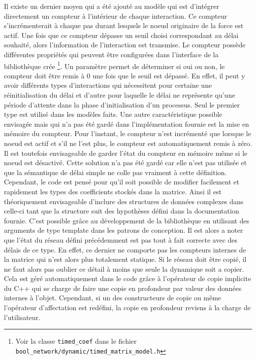 \documentclass[11pt, a4paper]{article}
\begin{document}
Il existe un dernier moyen qui a été ajouté au modèle qui est d'intégrer
directement un compteur à l'intérieur de chaque interaction. Ce compteur
s'incrémenterait à chaque pas durant lesquels le noeud originaire de la force
est actif. Une fois que ce compteur dépasse un seuil choisi correspondant au
délai souhaité, alors l'information de l'interaction est transmise. Le compteur
possède différentes propriétés qui peuvent être configurées dans l'interface de
la bibliothèque crée \footnote{Voir la classe \texttt{timed\_coef} dans le
fichier \texttt{bool\_network/dynamic/timed\_matrix\_model.h}}.  Un paramètre
permet de déterminer si oui ou non, le compteur doit être remis à $0$ une fois
que le seuil est dépassé. En effet, il peut y avoir différents types
d'interactions qui nécessitent pour certaine une réinitialisation du délai et
d'autre pour laquelle le délai ne représente qu'une période d'attente dans la
phase d'initialisation d'un processus. Seul le premier type est utilisé dans
les modèles faits. Une autre caractéristique possible envisagée mais qui n'a
pas été gardé dans l'implémentation fournie est la mise en mémoire du compteur.
Pour l'instant, le compteur n'est incrémenté que lorsque le noeud est actif et
s'il ne l'est plus, le compteur est automatiquement remis à zéro. Il est
toutefois envisageable de garder l'état du compteur en mémoire même si le noeud
est désactivé. Cette solution n'a pas été gardé car elle n'est pas utilisée et
que la sémantique de délai simple ne colle pas vraiment à cette définition.
Cependant, le code est pensé pour qu'il soit possible de modifier facilement et
rapidement les types des coefficients stockés dans la matrice. Ainsi il est
théoriquement envisageable d'inclure des structures de données complexes dans
celle-ci tant que la structure suit des hypothèses défini dans la documentation
fournie. C'est possible grâce au développement de la bibliothèque en utilisant
des arguments de type template dans les patrons de conception.  Il est alors a
noter que l'état du réseau défini précédemment est pas tout à fait correcte
avec des délais de ce type. En effet, ce dernier ne comporte pas les compteurs
internes de la matrice qui n'est alors plus totalement statique. Si le réseau
doit être copié, il ne faut alors pas oublier ce détail à moins que seule la
dynamique soit a copier. Cela est géré automatiquement dans le code grâce à
l'opérateur de copie implicite du C++ qui se charge de faire une copie en
profondeur par valeur des données internes à l'objet. Cependant, si un des
constructeurs de copie ou même l'opérateur d'affectation est redéfini, la copie
en profondeur reviens à la charge de l'utilisateur.
\end{document}
